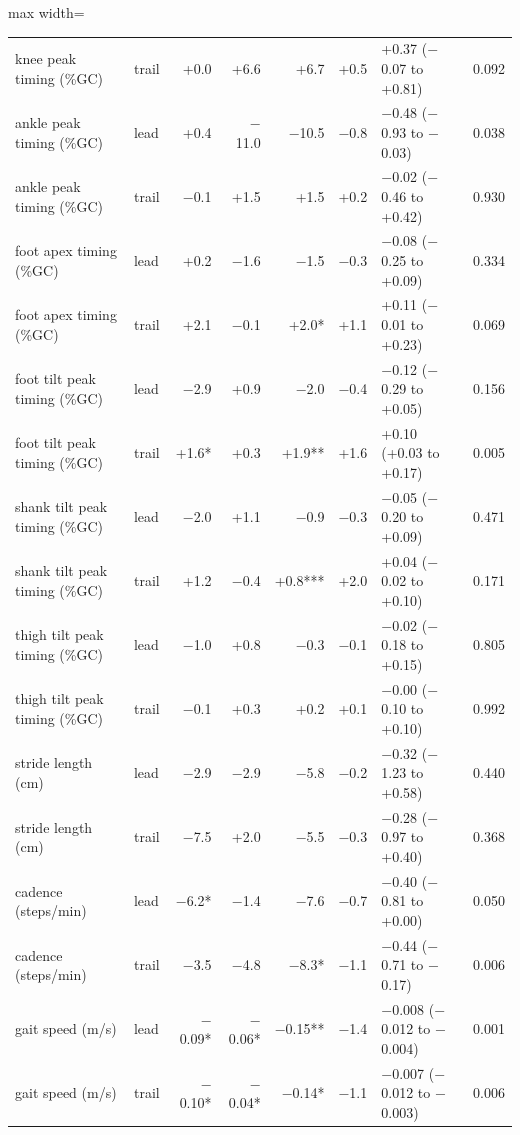\begin{adjustbox}{max width=\textwidth}
{\begin{tabular}{llrrrrlr}
knee peak timing (\%GC) & trail & +0.0 & +6.6 & +6.7 & +0.5 & +0.37 ($-$0.07 to +0.81) & 0.092 \\
ankle peak timing (\%GC) & lead & +0.4 & $-$11.0 & $-$10.5 & $-$0.8 & $-$0.48 ($-$0.93 to $-$0.03) & 0.038 \\
ankle peak timing (\%GC) & trail & $-$0.1 & +1.5 & +1.5 & +0.2 & $-$0.02 ($-$0.46 to +0.42) & 0.930 \\
foot apex timing (\%GC) & lead & +0.2 & $-$1.6 & $-$1.5 & $-$0.3 & $-$0.08 ($-$0.25 to +0.09) & 0.334 \\
foot apex timing (\%GC) & trail & +2.1 & $-$0.1 & +2.0* & +1.1 & +0.11 ($-$0.01 to +0.23) & 0.069 \\
foot tilt peak timing (\%GC) & lead & $-$2.9 & +0.9 & $-$2.0 & $-$0.4 & $-$0.12 ($-$0.29 to +0.05) & 0.156 \\
foot tilt peak timing (\%GC) & trail & +1.6* & +0.3 & +1.9** & +1.6 & +0.10 (+0.03 to +0.17) & 0.005 \\
shank tilt peak timing (\%GC) & lead & $-$2.0 & +1.1 & $-$0.9 & $-$0.3 & $-$0.05 ($-$0.20 to +0.09) & 0.471 \\
shank tilt peak timing (\%GC) & trail & +1.2 & $-$0.4 & +0.8*** & +2.0 & +0.04 ($-$0.02 to +0.10) & 0.171 \\
thigh tilt peak timing (\%GC) & lead & $-$1.0 & +0.8 & $-$0.3 & $-$0.1 & $-$0.02 ($-$0.18 to +0.15) & 0.805 \\
thigh tilt peak timing (\%GC) & trail & $-$0.1 & +0.3 & +0.2 & +0.1 & $-$0.00 ($-$0.10 to +0.10) & 0.992 \\
stride length (cm) & lead & $-$2.9 & $-$2.9 & $-$5.8 & $-$0.2 & $-$0.32 ($-$1.23 to +0.58) & 0.440 \\
stride length (cm) & trail & $-$7.5 & +2.0 & $-$5.5 & $-$0.3 & $-$0.28 ($-$0.97 to +0.40) & 0.368 \\
cadence (steps/min) & lead & $-$6.2* & $-$1.4 & $-$7.6 & $-$0.7 & $-$0.40 ($-$0.81 to +0.00) & 0.050 \\
cadence (steps/min) & trail & $-$3.5 & $-$4.8 & $-$8.3* & $-$1.1 & $-$0.44 ($-$0.71 to $-$0.17) & 0.006 \\
gait speed (m/s) & lead & $-$0.09* & $-$0.06* & $-$0.15** & $-$1.4 & $-$0.008 ($-$0.012 to $-$0.004) & 0.001 \\
gait speed (m/s) & trail & $-$0.10* & $-$0.04* & $-$0.14* & $-$1.1 & $-$0.007 ($-$0.012 to $-$0.003) & 0.006 \\
\bottomrule
\end{tabular}
}
\end{adjustbox}
